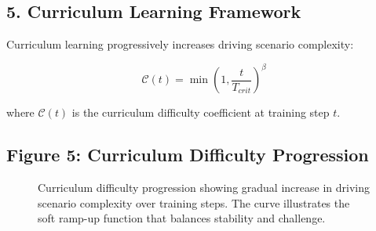 \documentclass[10pt,a4paper,twocolumn]{article}
\begin{document}
\vfill

\subsection*{5. Curriculum Learning Framework}

Curriculum learning progressively increases driving scenario complexity:

\begin{equation}
    \mathcal{C}(t) = \min\left(1,\frac{t}{T_{crit}}\right)^{\beta}
\end{equation}

where $\mathcal{C}(t)$ is the curriculum difficulty coefficient at training step $t$.

\subsection*{Figure 5: Curriculum Difficulty Progression}

\begin{figure}[h]
    \centering
    \caption{Curriculum difficulty progression showing gradual increase in driving scenario complexity over training steps. The curve illustrates the soft ramp-up function that balances stability and challenge.}
    \label{fig:curriculum_progression}
\end{figure}
\end{document}
